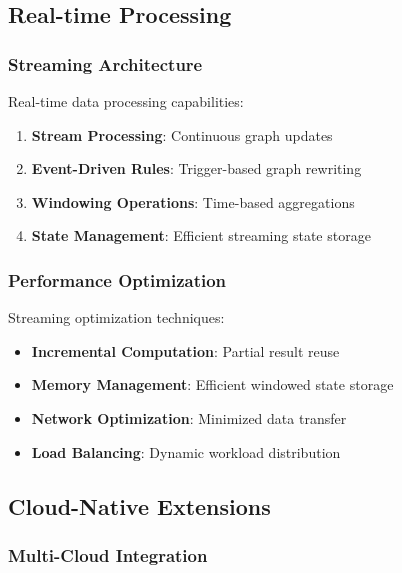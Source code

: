 \documentclass[11pt,a4paper]{article}
\begin{document}
\subsection{Real-time Processing}
\label{subsec:real_time}

\subsubsection{Streaming Architecture}
\label{subsubsec:streaming_architecture}

Real-time data processing capabilities:

\begin{enumerate}
\item \textbf{Stream Processing}: Continuous graph updates
\item \textbf{Event-Driven Rules}: Trigger-based graph rewriting
\item \textbf{Windowing Operations}: Time-based aggregations
\item \textbf{State Management}: Efficient streaming state storage
\end{enumerate}

\subsubsection{Performance Optimization}
\label{subsubsec:streaming_performance}

Streaming optimization techniques:

\begin{itemize}
\item \textbf{Incremental Computation}: Partial result reuse
\item \textbf{Memory Management}: Efficient windowed state storage
\item \textbf{Network Optimization}: Minimized data transfer
\item \textbf{Load Balancing}: Dynamic workload distribution
\end{itemize}

\subsection{Cloud-Native Extensions}
\label{subsec:cloud_extensions}

\subsubsection{Multi-Cloud Integration}
\label{subsubsec:multi_cloud}
\end{document}
